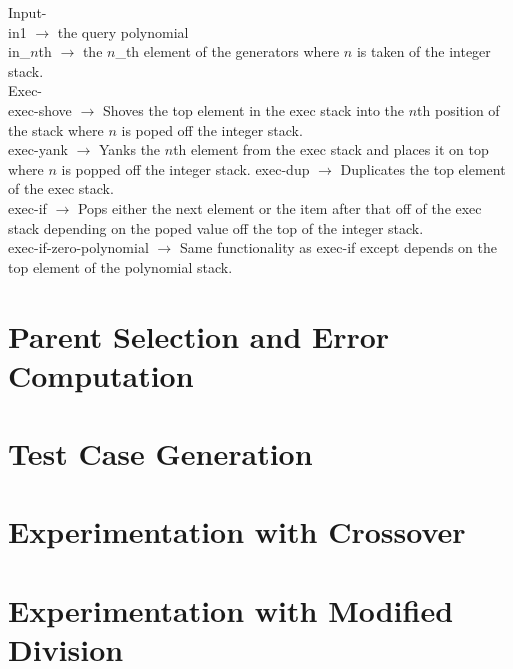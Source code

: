 \documentclass[12pt]{article}
\begin{document}
\noindent Input- \\
\indent in1 $\rightarrow$ the query polynomial \\
\indent in\_$n$th $\rightarrow$ the $n$\_th element of the generators where $n$ is taken of the integer stack. \\

\noindent Exec- \\
\indent exec-shove $\rightarrow$ Shoves the top element in the exec stack into the $n$th position of the stack where $n$ is poped off the integer stack. \\
\indent exec-yank $\rightarrow$ Yanks the $n$th element from the exec stack and places it on top where $n$ is popped off the integer stack.
\indent exec-dup $\rightarrow$ Duplicates the top element of the exec stack. \\
\indent exec-if $\rightarrow$ Pops either the next element or the item after that off of the exec stack depending on the poped value off the top of the integer stack. \\
\indent exec-if-zero-polynomial $\rightarrow$ Same functionality as exec-if except depends on the top element of the polynomial stack.


\newpage
\section*{Parent Selection and Error Computation}


\newpage
\section*{Test Case Generation}

\newpage
\section*{Experimentation with Crossover}

\newpage
\section*{Experimentation with Modified Division}
\end{document}
